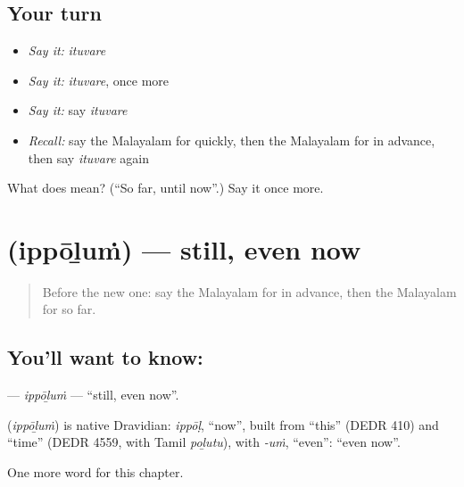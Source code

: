 \subsection*{Your turn}
\begin{itemize}
\raggedright
  \item \emph{Say it:} \emph{ituvare}
  \item \emph{Say it:} \emph{ituvare}, once more
  \item \emph{Say it:} say \emph{ituvare}
  \item \emph{Recall:} say the Malayalam for quickly, then the Malayalam for in advance, then say \emph{ituvare} again
\end{itemize}

\begin{tcolorbox}[breakable,colback=teal!4,colframe=teal!35!black,title={Before you move on}]
What does  mean? (\textquotedblleft{}So far, until now\textquotedblright{}.) Say it once more.
\end{tcolorbox}
\section[\texorpdfstring{\ml{ഇപ്പോഴും} (ippōḻuṁ)}{ഇപ്പോഴും (ippōḻuṁ)}]{ (ippōḻuṁ) — still, even now}

\label{lesson:ML-C196-ippolum}



\begin{quote}
Before the new one: say the Malayalam for in advance, then the Malayalam for so far.
\end{quote}

\subsection*{You'll want to know: }
\textbf{} — \emph{ippōḻuṁ} — \textquotedblleft{}still, even now\textquotedblright{}.

\begin{cousinweb}
\textbf{} (\emph{ippōḻuṁ}) is native Dravidian: \emph{ippōḷ}, \textquotedblleft{}now\textquotedblright{}, built from \textquotedblleft{}this\textquotedblright{} (DEDR 410) and \textquotedblleft{}time\textquotedblright{} (DEDR 4559, with Tamil \emph{poḻutu}), with \emph{-uṁ}, \textquotedblleft{}even\textquotedblright{}: \textquotedblleft{}even now\textquotedblright{}.
\end{cousinweb}

\begin{grammarlens}[title={What you've built}]
One more word for this chapter.
\end{grammarlens}

